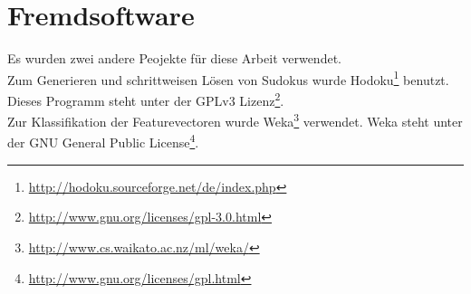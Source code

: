 \section{Fremdsoftware}
\label{Fremdsoftware}
Es wurden zwei andere Peojekte für diese Arbeit verwendet.\\
Zum Generieren und schrittweisen Lösen von Sudokus wurde Hodoku\footnote{\url{http://hodoku.sourceforge.net/de/index.php}} benutzt. Dieses Programm steht unter der GPLv3 Lizenz\footnote{\url{http://www.gnu.org/licenses/gpl-3.0.html}}.\\
Zur Klassifikation der Featurevectoren wurde Weka\footnote{\url{http://www.cs.waikato.ac.nz/ml/weka/}} verwendet. Weka steht unter der GNU General Public License\footnote{\url{http://www.gnu.org/licenses/gpl.html}}.
